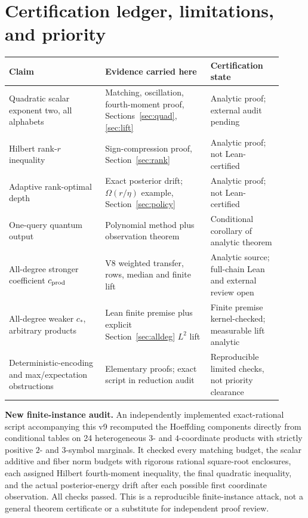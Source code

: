 \documentclass[11pt,letterpaper]{article}
\theoremstyle{definition}\newtheorem{definition}[theorem]{Definition}
\newcommand{\cprod}{c_{\rm prod}}
\begin{document}
\section{Certification ledger, limitations, and priority}\label{sec:status}
\begin{center}\small
\begin{tabular}{@{}>{\raggedright\arraybackslash}p{0.32\linewidth}>{\raggedright\arraybackslash}p{0.35\linewidth}>{\raggedright\arraybackslash}p{0.24\linewidth}@{}}\toprule
\textbf{Claim} & \textbf{Evidence carried here} & \textbf{Certification state}\\\midrule
Quadratic scalar exponent two, all alphabets & Matching, oscillation, fourth-moment proof, Sections~\ref{sec:quad}, \ref{sec:lift} & Analytic proof; external audit pending\\
Hilbert rank-$r$ inequality & Sign-compression proof, Section~\ref{sec:rank} & Analytic proof; not Lean-certified\\
Adaptive rank-optimal depth & Exact posterior drift; $\Omega(r/\eta)$ example, Section~\ref{sec:policy} & Analytic proof; not Lean-certified\\
One-query quantum output & Polynomial method plus observation theorem & Conditional corollary of analytic theorem\\
All-degree stronger coefficient $\cprod$ & V8 weighted transfer, rows, median and finite lift & Analytic source; full-chain Lean and external review open\\
All-degree weaker $c_*$, arbitrary products & Lean finite premise plus explicit Section~\ref{sec:alldeg} $L^2$ lift & Finite premise kernel-checked; measurable lift analytic\\
Deterministic-encoding and max/expectation obstructions & Elementary proofs; exact script in reduction audit & Reproducible limited checks, not priority clearance\\\bottomrule
\end{tabular}
\end{center}

\noindent\textbf{New finite-instance audit.} An independently implemented exact-rational script accompanying this v9 recomputed the Hoeffding components directly from conditional tables on 24 heterogeneous $3$- and $4$-coordinate products with strictly positive $2$- and $3$-symbol marginals. It checked every matching budget, the scalar additive and fiber norm budgets with rigorous rational square-root enclosures, each assigned Hilbert fourth-moment inequality, the final quadratic inequality, and the actual posterior-energy drift after each possible first coordinate observation. All checks passed. This is a reproducible finite-instance attack, not a general theorem certificate or a substitute for independent proof review.\par\medskip
\end{document}
